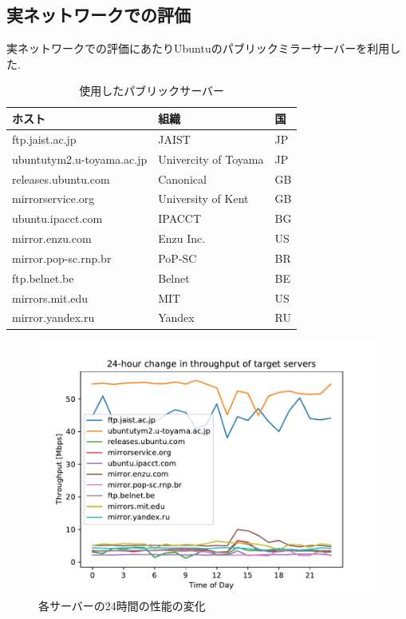 \documentclass[a4j,12pt]{gradthesis_utf8}
\begin{document}
\subsection{実ネットワークでの評価}
実ネットワークでの評価にあたりUbuntuのパブリックミラーサーバーを利用した.\\
\begin{table}[htb]
	\begin{center}
		\caption{使用したパブリックサーバー}
		\begin{tabular}{|l|l|l|} \hline
			ホスト & 組織 & 国\\ \hline
			ftp.jaist.ac.jp & JAIST & JP \\
			ubuntutym2.u-toyama.ac.jp & Univercity of Toyama & JP \\
			releases.ubuntu.com & Canonical & GB \\
			mirrorservice.org & University of Kent & GB \\
			ubuntu.ipacct.com & IPACCT & BG \\
			mirror.enzu.com & Enzu Inc. & US \\
			mirror.pop-sc.rnp.br & PoP-SC & BR \\
			ftp.belnet.be & Belnet & BE \\
			mirrors.mit.edu & MIT & US \\
			mirror.yandex.ru & Yandex & RU \\ \hline
		\end{tabular}
	\end{center}
\end{table}

\begin{figure}
    \begin{center}
        \includegraphics[width=15cm]{thp24h.pdf}
        \caption{各サーバーの24時間の性能の変化}
    \end{center}
\end{figure}
\end{document}
